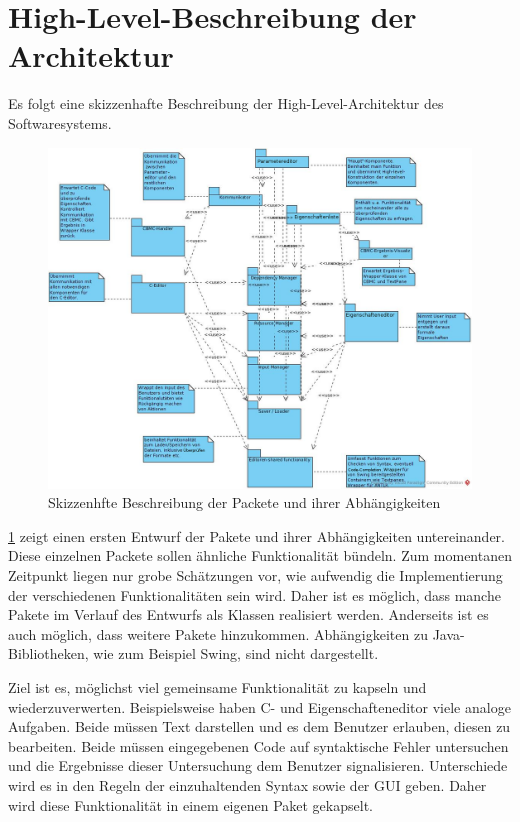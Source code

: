 \documentclass[a4paper]{scrreprt}
\begin{document}
\section{High-Level-Beschreibung der Architektur}	
Es folgt eine skizzenhafte Beschreibung der High-Level-Architektur des Softwaresystems. 

\begin{figure}[H]
\includegraphics[scale=0.4]{architecture_first_scetch.png}
\caption{Skizzenhfte Beschreibung der Packete und ihrer Abhängigkeiten}
\label{Packet-scetch}
\end{figure}

\ref{Packet-scetch} zeigt einen ersten Entwurf der Pakete und ihrer Abhängigkeiten untereinander. Diese einzelnen Packete sollen ähnliche Funktionalität bündeln. Zum momentanen Zeitpunkt liegen nur grobe Schätzungen vor, wie aufwendig die Implementierung der verschiedenen Funktionalitäten sein wird. Daher ist es möglich, dass manche Pakete im Verlauf des Entwurfs als Klassen realisiert werden. Anderseits ist es auch möglich, dass weitere Pakete hinzukommen. Abhängigkeiten zu Java-Bibliotheken, wie zum Beispiel Swing, sind nicht dargestellt.

Ziel ist es, möglichst  viel gemeinsame Funktionalität zu kapseln und wiederzuverwerten. Beispielsweise haben C- und Eigenschafteneditor viele analoge Aufgaben. Beide müssen Text darstellen und es dem Benutzer erlauben, diesen zu bearbeiten. Beide müssen eingegebenen Code auf syntaktische Fehler untersuchen und die Ergebnisse dieser Untersuchung dem Benutzer signalisieren. Unterschiede wird es in den Regeln der einzuhaltenden Syntax sowie der \ac{GUI} geben. Daher wird diese Funktionalität in einem eigenen Paket gekapselt. 
\end{document}
